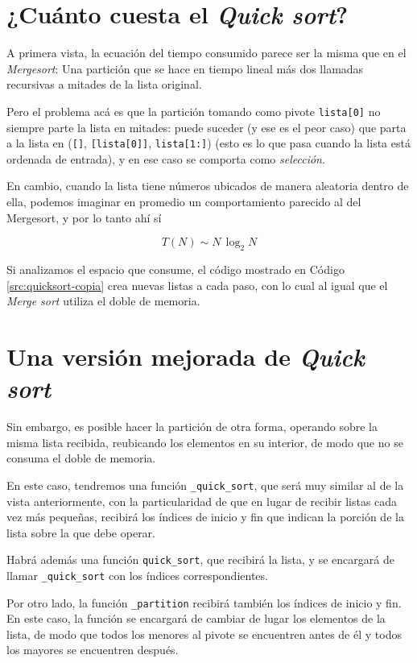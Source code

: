 \section{¿Cuánto cuesta el {\it Quick sort}?}

A primera vista, la ecuación del tiempo consumido parece ser la misma que
en el {\it Mergesort}: Una partición que se hace en tiempo lineal más dos
llamadas recursivas a mitades de la lista original.

Pero el problema acá es que la partición tomando como pivote
\lstinline!lista[0]! no siempre parte la lista en mitades: puede suceder (y
ese es el peor caso) que parta a la lista en (\lstinline![]!,
\lstinline![lista[0]]!, \lstinline!lista[1:]!) (esto es lo que pasa cuando
la lista está ordenada de entrada), y en ese
caso se comporta como {\it selección}.

En cambio, cuando la lista tiene números ubicados de manera aleatoria
dentro de ella, podemos imaginar en promedio un comportamiento parecido al del
Mergesort, y por lo tanto ahí sí

$$T(N) \sim N \, \log_2 N$$

Si analizamos el espacio que consume, el código mostrado en Código
\ref{src:quicksort-copia} crea nuevas listas a cada paso, con lo cual al
igual que el {\it Merge sort} utiliza el doble de memoria.

\section{Una versión mejorada de {\it Quick sort}}

Sin embargo, es posible hacer la partición de otra forma, operando sobre la
misma lista recibida, reubicando los elementos en su interior, de modo que
no se consuma el doble de memoria.

En este caso, tendremos una función \lstinline!_quick_sort!, que será muy
similar al de la vista anteriormente, con la particularidad de que en lugar
de recibir listas cada vez más pequeñas, recibirá los índices de inicio y
fin que indican la porción de la lista sobre la que debe operar.

Habrá además una función \lstinline!quick_sort!, que recibirá la lista,
y se encargará de llamar \lstinline!_quick_sort! con los
índices correspondientes.

Por otro lado, la función \lstinline!_partition! recibirá también los
índices de inicio y fin.  En este caso, la función se encargará de cambiar
de lugar los elementos de la lista, de modo que todos los menores al pivote
se encuentren antes de él y todos los mayores se encuentren después.


